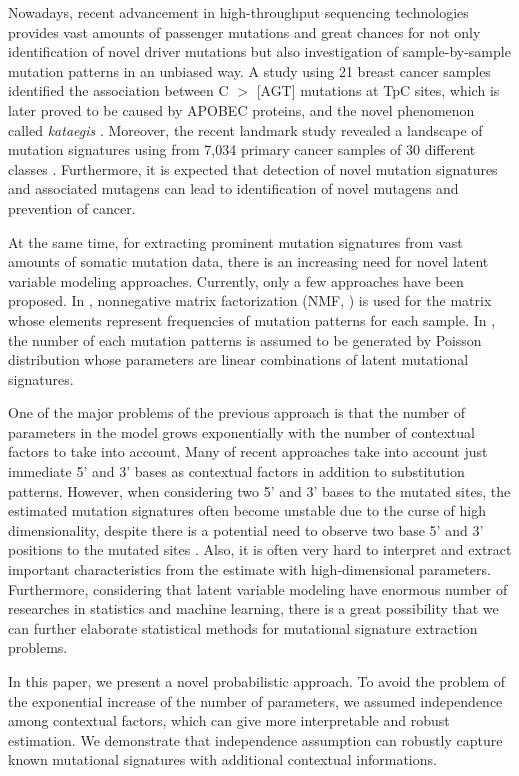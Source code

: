 Nowadays, recent advancement in high-throughput sequencing technologies provides vast amounts of passenger mutations
and great chances for not only identification of novel driver mutations but also investigation of sample-by-sample mutation patterns in an unbiased way. 
A study using 21 breast cancer samples identified the association between C $>$ [AGT] mutations at TpC sites, 
which is later proved to be caused by APOBEC proteins, and the novel phenomenon called {\it kataegis} \cite{pmid22608084}. 
Moreover, the recent landmark study revealed a landscape of mutation signatures using from 7,034 primary cancer samples of 30 different classes \cite{pmid23945592}. 
Furthermore, it is expected that detection of novel mutation signatures and associated mutagens can lead to identification of novel mutagens and prevention of cancer.


At the same time, for extracting prominent mutation signatures from vast amounts of somatic mutation data,
there is an increasing need for novel latent variable modeling approaches.
Currently, only a few approaches have been proposed. 
In \cite{pmid23318258}, nonnegative matrix factorization (NMF, \cite{pmid10548103}) is used for the matrix whose elements represent frequencies of mutation patterns for each sample. 
In \cite{pmid23628380}, the number of each mutation patterns is assumed to be generated by Poisson distribution whose parameters are linear combinations of latent mutational signatures. 


One of the major problems of the previous approach is that 
the number of parameters in the model grows exponentially 
with the number of contextual factors to take into account.
Many of recent approaches take into account just immediate 5' and 3' bases as contextual factors in addition to substitution patterns.
However, when considering two 5' and 3' bases to the mutated sites,
the estimated mutation signatures often become unstable due to the curse of high dimensionality, 
despite there is a potential need to observe two base 5' and 3' positions to the mutated sites \cite{pmid9683596}.
Also, it is often very hard to interpret and extract important characteristics from the estimate with high-dimensional parameters.
Furthermore, considering that latent variable modeling have enormous number of researches in statistics and machine learning, 
there is a great possibility that we can further elaborate statistical methods for mutational signature extraction problems.

In this paper, we present a novel probabilistic approach.
To avoid the problem of the exponential increase of the number of parameters,
we assumed independence among contextual factors, which can give more interpretable and robust estimation.
We demonstrate that independence assumption can robustly capture known mutational signatures with additional contextual informations.

